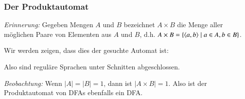 \documentclass[onlymath]{beamer}
\begin{document}
\begin{frame}\frametitle{Der Produktautomat}

\emph{Erinnerung:} Gegeben Mengen $A$ und $B$ bezeichnet $A\times B$ die Menge aller möglichen Paare von Elementen aus $A$ und $B$, d.h. $A\times B=\{\langle{a,b}\rangle\mid a\in A, b\in B\}$.
\medskip

\pause

Wir werden zeigen, dass dies der gesuchte Automat ist:


Also sind reguläre Sprachen unter Schnitten abgeschlossen.
\bigskip

\emph{Beobachtung:} Wenn $|A|=|B|=1$, dann ist $|A\times B|=1$. Also ist der Produktautomat von DFAs ebenfalls ein DFA.

\end{frame}
\end{document}

